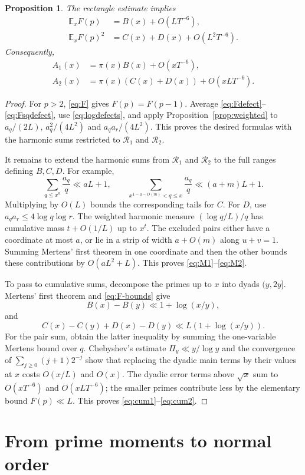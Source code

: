 \documentclass[10pt]{article}
\newtheorem{prop}[thm]{Proposition}
\newcommand{\EE}{\mathbb E}
\newcommand{\calR}{\mathcal R}
\begin{document}
\begin{prop}\label{prop:prime-moments}
The rectangle estimate implies
\begin{align}
 \EE_x F(p)&=B(x)+O(LT^{-6}),\label{eq:M1}\\
 \EE_x F(p)^2&=C(x)+D(x)+O(L^2T^{-6}).\label{eq:M2}
\end{align}
Consequently,
\begin{align}
 A_1(x)&=\pi(x)B(x)+O(xT^{-6}),\label{eq:cum1}\\
 A_2(x)&=\pi(x)(C(x)+D(x))+O(xLT^{-6}).\label{eq:cum2}
\end{align}
\end{prop}
\begin{proof}
For $p>2$, \eqref{eq:F} gives $F(p)=F(p-1)$. Average \eqref{eq:Fdefect}--\eqref{eq:Fsqdefect}, use \eqref{eq:logdefects}, and apply Proposition~\ref{prop:weighted} to $a_q/(2L)$, $a_q^2/(4L^2)$ and $a_qa_r/(4L^2)$. This proves the desired formulas with the harmonic sums restricted to $\calR_1$ and $\calR_2$.

It remains to extend the harmonic sums from $\calR_1$ and $\calR_2$ to the full ranges defining $B,C,D$. For example,
\[
 \sum_{q\leq x^a}\frac{a_q}{q}\ll aL+1,\qquad
 \sum_{x^{1-a-O(m)}<q\leq x}\frac{a_q}{q}\ll(a+m)L+1.
\]
Multiplying by $O(L)$ bounds the corresponding tails for $C$. For $D$, use $a_qa_r\leq4\log q\log r$. The weighted harmonic measure $(\log q/L)/q$ has cumulative mass $t+O(1/L)$ up to $x^t$. The excluded pairs either have a coordinate at most $a$, or lie in a strip of width $a+O(m)$ along $u+v=1$. Summing Mertens' first theorem in one coordinate and then the other bounds these contributions by $O(aL^2+L)$. This proves \eqref{eq:M1}--\eqref{eq:M2}.

To pass to cumulative sums, decompose the primes up to $x$ into dyads $(y,2y]$. Mertens' first theorem and \eqref{eq:F-bounds} give
\[
 B(x)-B(y)\ll1+\log(x/y),
\]
and
\[
 C(x)-C(y)+D(x)-D(y)
 \ll L(1+\log(x/y)).
\]
For the pair sum, obtain the latter inequality by summing the one-variable Mertens bound over $q$. Chebyshev's estimate $\Pi_y\ll y/\log y$ and the convergence of $\sum_{j\geq0}(j+1)2^{-j}$ show that replacing the dyadic main terms by their values at $x$ costs $O(x/L)$ and $O(x)$. The dyadic error terms above $\sqrt{x}$ sum to $O(xT^{-6})$ and $O(xLT^{-6})$; the smaller primes contribute less by the elementary bound $F(p)\ll L$. This proves \eqref{eq:cum1}--\eqref{eq:cum2}.
\end{proof}

\section{From prime moments to normal order}\label{sec:renewal}
\end{document}

